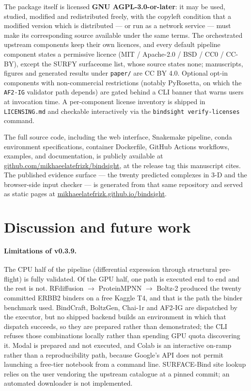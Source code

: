 \documentclass[11pt,letterpaper]{article}
\begin{document}
The package itself is licensed \textbf{GNU AGPL-3.0-or-later}: it may be used,
studied, modified and redistributed freely, with the copyleft condition that a
modified version which is distributed --- or run as a network service --- must
make its corresponding source available under the same terms. The orchestrated
upstream components keep their own licences, and every default pipeline
component states a permissive licence (MIT / Apache-2.0 / BSD / CC0 / CC-BY),
except the SURFY surfaceome list, whose source states none; manuscripts, figures
and generated results under \texttt{paper/} are CC BY 4.0.
Optional opt-in components with non-commercial restrictions
(notably PyRosetta, on which the \texttt{AF2-IG} validator path depends) are
gated behind a CLI banner that warns users at invocation time.
A per-component license inventory is shipped in \texttt{LICENSING.md} and
checkable interactively via the \texttt{bindsight verify-licenses} command.

The full source code, including the web interface, Snakemake
pipeline, conda environment specifications, container Dockerfile, GitHub
Actions workflows, examples, and documentation, is publicly available at
\href{https://github.com/mikhaeelatefrizk/bindsight}{github.com/mikhaeelatefrizk/bindsight},
at the release tag this manuscript cites.
The published evidence surface --- the twenty predicted complexes in 3-D and
the browser-side input checker --- is generated from that same repository and
served as static pages at \href{https://mikhaeelatefrizk.github.io/bindsight/}{mikhaeelatefrizk.github.io/bindsight}.

\section{Discussion and future work}

\paragraph{Limitations of v0.3.9.} The CPU half of the pipeline
(differential expression through structural pre-flight) is fully validated. Of
the GPU half, one path is executed end to end and the rest is not.
RFdiffusion $\to$ ProteinMPNN $\to$ Boltz-2 produced the twenty committed ERBB2
binders on a free Kaggle T4, and that is the path the binder benchmark used.
BindCraft, BoltzGen, Chai-1r and AF2-IG are dispatched by the executor, but no
shipped backend builds an environment in which that dispatch succeeds, so they
are prepared rather than demonstrated; the CLI refuses those combinations
locally rather than spending GPU quota discovering it. Modal is prepared and not
executed, and Colab is an interactive on-ramp rather than a reproducibility
path, because Google's API does not permit launching a free-tier notebook from a
command line. SURFACE-Bind site lookup relies on the user vendoring the upstream
catalogue at a pinned commit; an automated downloader is not implemented.
\end{document}
